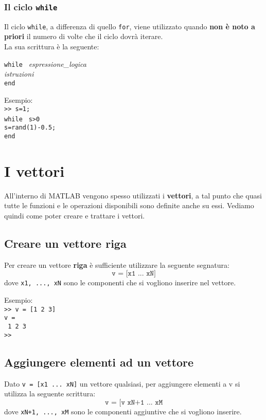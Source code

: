 \documentclass[12pt,a4paper,oneside]{book}
\begin{document}
\subsection{Il ciclo \texttt{while}}
Il ciclo \texttt{while}, a differenza di quello \texttt{for}, viene utilizzato quando \textbf{non è noto a priori} il numero di volte che il ciclo dovrà iterare. \\
La sua scrittura è la seguente:
\begin{center}
\texttt{while } \textit{espressione\_logica} \\ 
\hspace{1.5cm}\textit{istruzioni}  \\
\hspace{-4.1cm}\texttt{end}
\end{center}

Esempio: \\
\texttt{>> s=1;} \\
\texttt{while } \texttt{s>0} \\ 
\hspace{1cm}\texttt{s=rand(1)-0.5;}  \\
\texttt{end}


\newpage

\chapter{I vettori}
All'interno di MATLAB vengono spesso utilizzati i \textbf{vettori}, a tal punto che quasi tutte le funzioni e le operazioni disponibili sono definite anche su essi. Vediamo quindi come poter creare e trattare i vettori.

\section{Creare un vettore riga}
Per creare un vettore \textbf{riga} è sufficiente utilizzare la seguente segnatura:
$$ \texttt{v = [x1 ... xN]} $$
dove \texttt{x1, ..., xN} sono le componenti che si vogliono inserire nel vettore.

Esempio: \\
\texttt{>> v = [1 2 3]} \\
\texttt{v = } \\
\texttt{\hspace{0.5cm} 1 \hspace{0.5cm} 2 \hspace{0.5cm} 3} \\
\texttt{>>}

\section{Aggiungere elementi ad un vettore}
Dato \texttt{v = [x1 ... xN]} un vettore qualsiasi, per aggiungere elementi a v si utilizza la seguente scrittura:
$$ \texttt{v = [v xN+1 ... xM} $$
dove \texttt{xN+1, ..., xM} sono le componenti aggiuntive che si vogliono inserire.
\end{document}

